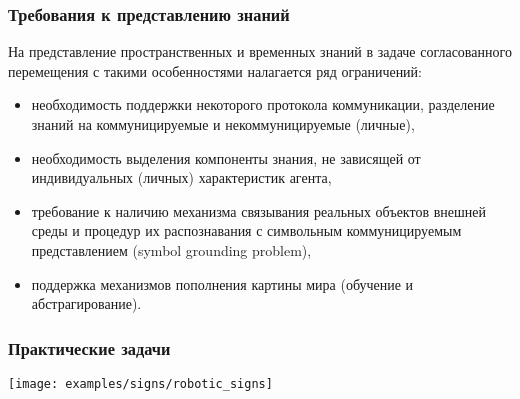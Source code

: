 \documentclass[default]{beamer}
\begin{document}
	\begin{frame}
		\frametitle{Требования к представлению знаний}
		
		На представление пространственных и временных знаний в задаче согласованного перемещения с такими особенностями налагается ряд ограничений:
		\begin{itemize}
			\item необходимость поддержки некоторого протокола коммуникации, разделение знаний на коммуницируемые и некоммуницируемые (личные),
			\item необходимость выделения компоненты знания, не зависящей от индивидуальных (личных) характеристик агента,
			\item требование к наличию механизма связывания реальных объектов внешней среды и процедур их распознавания с символьным коммуницируемым представлением (symbol grounding problem),
			\item поддержка механизмов пополнения картины мира (обучение и абстрагирование).
		\end{itemize}
	\end{frame}

	\begin{frame}
		\frametitle{Практические задачи}
		
		\centering
		\texttt{[image: examples/signs/robotic\_signs]}

	\end{frame}
	
\end{document}
